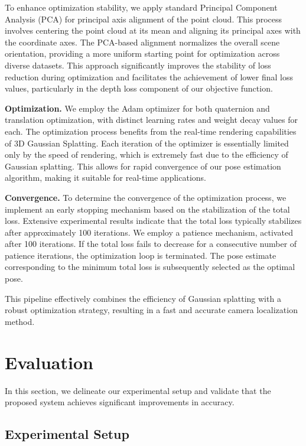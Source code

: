 \documentclass[twocolumn]{article} %
\begin{document}
To enhance optimization stability, we apply standard Principal Component
Analysis (PCA) for principal axis alignment of the point cloud. This
process involves centering the point cloud at its mean and aligning its
principal axes with the coordinate axes. The PCA-based alignment
normalizes the overall scene orientation, providing a more uniform
starting point for optimization across diverse datasets. This approach
significantly improves the stability of loss reduction during
optimization and facilitates the achievement of lower final loss values,
particularly in the depth loss component of our objective function.

\textbf{Optimization.} We employ the Adam optimizer for both quaternion
and translation optimization, with distinct learning rates and weight
decay values for each. The optimization process benefits from the
real-time rendering capabilities of 3D Gaussian Splatting. Each
iteration of the optimizer is essentially limited only by the speed of
rendering, which is extremely fast due to the efficiency of Gaussian
splatting. This allows for rapid convergence of our pose estimation
algorithm, making it suitable for real-time applications.

\textbf{Convergence.} To determine the convergence of the optimization
process, we implement an early stopping mechanism based on the
stabilization of the total loss. Extensive experimental results indicate
that the total loss typically stabilizes after approximately 100
iterations. We employ a patience mechanism, activated after 100
iterations. If the total loss fails to decrease for a consecutive number
of patience iterations, the optimization loop is terminated. The pose
estimate corresponding to the minimum total loss is subsequently
selected as the optimal pose.

This pipeline effectively combines the efficiency of Gaussian splatting
with a robust optimization strategy, resulting in a fast and accurate
camera localization method.

\section{Evaluation}\label{evaluation}

In this section, we delineate our experimental setup and validate that
the proposed system achieves significant improvements in accuracy.

\subsection{Experimental Setup}\label{experimental-setup}
\end{document}
